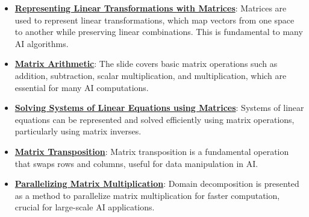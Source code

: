 \documentclass{article}%
\begin{document}
\begin{itemize}[leftmargin=*]%
\item \href{https://purdue.brightspace.com/d2l/common/assets/pdfjs-d2l-dist/1.0.14-legacy/web/viewer.html?file=\%2Fcontent\%2Fenforced\%2F1095467-wl.202510.CS.24300.001\%2F04L1-Linear Algebra Primer.pdf\%3Fou\%3D1095467\&lang=en-us\&container=d2l-fileviewer-rendered-pdf\&fullscreen=d2l-fileviewer-rendered-pdf-dialog\&height=667#page=5}{\textbf{Representing Linear Transformations with Matrices}}: Matrices are used to represent linear transformations, which map vectors from one space to another while preserving linear combinations. This is fundamental to many AI algorithms.%
\item \href{https://purdue.brightspace.com/d2l/common/assets/pdfjs-d2l-dist/1.0.14-legacy/web/viewer.html?file=\%2Fcontent\%2Fenforced\%2F1095467-wl.202510.CS.24300.001\%2F04L1-Linear Algebra Primer.pdf\%3Fou\%3D1095467\&lang=en-us\&container=d2l-fileviewer-rendered-pdf\&fullscreen=d2l-fileviewer-rendered-pdf-dialog\&height=667#page=9}{\textbf{Matrix Arithmetic}}: The slide covers basic matrix operations such as addition, subtraction, scalar multiplication, and multiplication, which are essential for many AI computations.%
\item \href{https://purdue.brightspace.com/d2l/common/assets/pdfjs-d2l-dist/1.0.14-legacy/web/viewer.html?file=\%2Fcontent\%2Fenforced\%2F1095467-wl.202510.CS.24300.001\%2F04L1-Linear Algebra Primer.pdf\%3Fou\%3D1095467\&lang=en-us\&container=d2l-fileviewer-rendered-pdf\&fullscreen=d2l-fileviewer-rendered-pdf-dialog\&height=667#page=11}{\textbf{Solving Systems of Linear Equations using Matrices}}: Systems of linear equations can be represented and solved efficiently using matrix operations, particularly using matrix inverses.%
\item \href{https://purdue.brightspace.com/d2l/common/assets/pdfjs-d2l-dist/1.0.14-legacy/web/viewer.html?file=\%2Fcontent\%2Fenforced\%2F1095467-wl.202510.CS.24300.001\%2F04L1-Linear Algebra Primer.pdf\%3Fou\%3D1095467\&lang=en-us\&container=d2l-fileviewer-rendered-pdf\&fullscreen=d2l-fileviewer-rendered-pdf-dialog\&height=667#page=16}{\textbf{Matrix Transposition}}: Matrix transposition is a fundamental operation that swaps rows and columns, useful for data manipulation in AI.%
\item \href{https://purdue.brightspace.com/d2l/common/assets/pdfjs-d2l-dist/1.0.14-legacy/web/viewer.html?file=\%2Fcontent\%2Fenforced\%2F1095467-wl.202510.CS.24300.001\%2F04L1-Linear Algebra Primer.pdf\%3Fou\%3D1095467\&lang=en-us\&container=d2l-fileviewer-rendered-pdf\&fullscreen=d2l-fileviewer-rendered-pdf-dialog\&height=667#page=18}{\textbf{Parallelizing Matrix Multiplication}}: Domain decomposition is presented as a method to parallelize matrix multiplication for faster computation, crucial for large-scale AI applications.%

\end{itemize}
\end{document}
